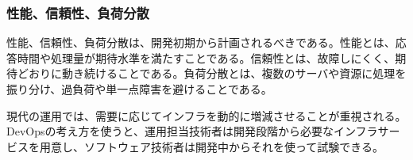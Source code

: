 \subsubsection{性能、信頼性、負荷分散}

性能、信頼性、負荷分散は、開発初期から計画されるべきである。性能とは、応答時間や処理量が期待水準を満たすことである。信頼性とは、故障しにくく、期待どおりに動き続けることである。負荷分散とは、複数のサーバや資源に処理を振り分け、過負荷や単一点障害を避けることである。

現代の運用では、需要に応じてインフラを動的に増減させることが重視される。DevOpsの考え方を使うと、運用担当技術者は開発段階から必要なインフラサービスを用意し、ソフトウェア技術者は開発中からそれを使って試験できる。

